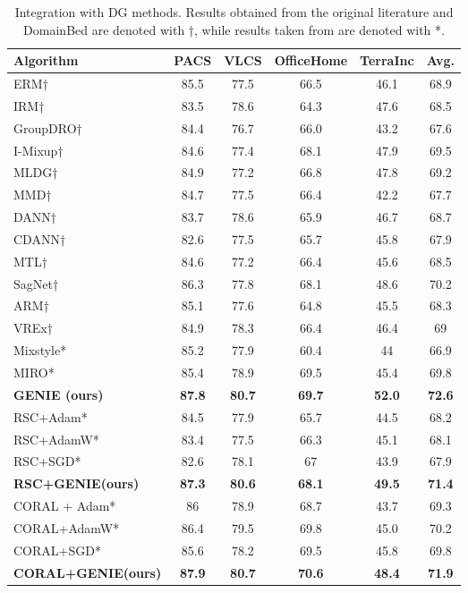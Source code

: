 \documentclass{article}
\theoremstyle{plain}
\theoremstyle{definition}
\theoremstyle{remark}
\begin{document}
\begin{table}[!t]
\centering
\caption{Integration with DG methods. Results obtained from the original literature and DomainBed \cite{domainbed} are denoted with †, while results taken from \cite{dg_opt} are denoted with *.}
\label{tab:dg}
\vskip 0.15in
\renewcommand{\arraystretch}{1.1}
\begin{small}
\begin{sc}
\begin{tabular}{lcccc|c}
\toprule
\textbf{Algorithm} & PACS & VLCS & OfficeHome & TerraInc & \textbf{Avg.} \\ 
\midrule
ERM†\cite{erm}           & 85.5 & 77.5 & 66.5 & 46.1 & 68.9\\ 
IRM†\cite{irm}           & 83.5 & 78.6 & 64.3 & 47.6 & 68.5\\ 
GroupDRO†\cite{groupdro}      & 84.4 & 76.7 & 66.0 & 43.2 & 67.6\\ 
I-Mixup†\cite{i-mixup_1}       & 84.6 & 77.4 & 68.1 & 47.9 & 69.5\\ 
MLDG†\cite{mldg}          & 84.9 & 77.2 & 66.8 & 47.8 & 69.2\\
 MMD†\cite{mmd}           & 84.7 & 77.5 & 66.4 & 42.2 &67.7\\ 
DANN†\cite{dann}          & 83.7 & 78.6 & 65.9 & 46.7 & 68.7\\ 
CDANN†\cite{cdann}& 82.6& 77.5& 65.7& 45.8& 67.9
\\ 
MTL†\cite{mtl}           & 84.6& 77.2 & 66.4 & 45.6 & 68.5\\ 
SagNet†\cite{sagnet}        & 86.3 & 77.8 & 68.1 & 48.6 & 70.2\\ 
ARM†\cite{arm}           & 85.1 & 77.6 & 64.8 & 45.5 & 68.3\\ 
VREx†\cite{vrex}          & 84.9 & 78.3 & 66.4 & 46.4 & 69\\
Mixstyle*\cite{mixstyle}& 85.2& 77.9& 60.4& 44&66.9\\
 MIRO*\cite{miro}& 85.4& 78.9& 69.5& 45.4&69.8\\
\textbf{GENIE (ours)}& \textbf{87.8}& \textbf{80.7}& \textbf{69.7}& \textbf{52.0}&\textbf{72.6}\\
\midrule
\midrule
RSC\cite{rsc}+Adam*& 84.5& 77.9& 65.7& 44.5&68.2\\
RSC+AdamW*& 83.4& 77.5& 66.3& 45.1&68.1\\
RSC+SGD*& 82.6& 78.1& 67& 43.9&67.9\\ 
\textbf{RSC+GENIE(ours)}& \textbf{87.3}& \textbf{80.6}& \textbf{68.1}& \textbf{49.5}& \textbf{71.4}\\ 
\midrule
CORAL\cite{coral} + Adam*& 86& 78.9 & 68.7 & 43.7 & 69.3\\ 
CORAL+AdamW*& 86.4 & 79.5 & 69.8 & 45.0 & 70.2\\ 
CORAL+SGD*& 85.6 & 78.2 & 69.5 & 45.8 & 69.8\\ 
\textbf{CORAL+GENIE(ours)}& \textbf{87.9}& \textbf{80.7}& \textbf{70.6}& \textbf{48.4}& \textbf{71.9}\\
\bottomrule
\end{tabular}
\end{sc}
\end{small}
\vskip -0.1in
\end{table}
\end{document}
